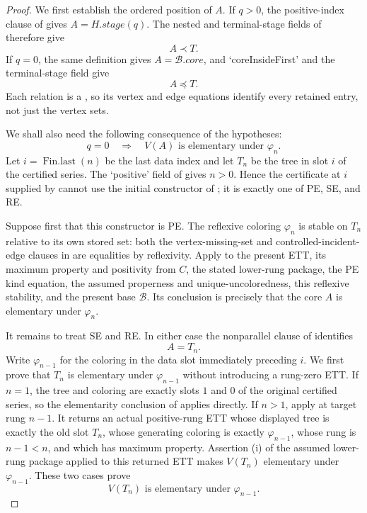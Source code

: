 \begin{proof}
We first establish the ordered position of $A$.  If $q>0$, the
positive-index clause of  gives
$A=H.\mathit{stage}(q)$.  The nested and terminal-stage fields of
 therefore give
\[
                     A\prec T.                                 \tag{1}
\]
If $q=0$, the same definition gives $A=\mathcal B.\mathit{core}$,
and `coreInsideFirst' and the terminal-stage field give
\[
                     A\preccurlyeq T.                           \tag{2}
\]
Each relation is a , so its vertex
and edge equations identify every retained entry, not just the vertex
sets.

We shall also need the following consequence of the hypotheses:
\[
 q=0\quad\Longrightarrow\quad
 V(A)\text{ is elementary under }\varphi_n.                    \tag{3}
\]
Let $i=\operatorname{Fin.last}(n)$ be the last data index and let
$T_n$ be the tree in slot $i$ of the certified series.  The `positive'
field of  gives $n>0$.  Hence the
certificate at $i$ supplied by  cannot use the
initial constructor of ; it is exactly one
of PE, SE, and RE.

Suppose first that this constructor is PE.  The reflexive coloring
$\varphi_n$ is stable on $T_n$ relative to its own stored set: both the
vertex-missing-set and controlled-incident-edge clauses in
 are equalities by reflexivity.  Apply
 to the present ETT, its maximum
property and positivity from $C$, the stated lower-rung package, the PE
kind equation, the assumed properness and unique-uncoloredness, this
reflexive stability, and the present base $\mathcal B$.  Its conclusion
is precisely that the core $A$ is elementary under $\varphi_n$.

It remains to treat SE and RE.  In either case the nonparallel clause of
 identifies
\[
                              A=T_n.                            \tag{4}
\]
Write $\varphi_{n-1}$ for the coloring in the data slot immediately
preceding $i$.  We first prove that $T_n$ is elementary under
$\varphi_{n-1}$ without introducing a rung-zero ETT.  If $n=1$, the
tree and coloring are exactly slots $1$ and $0$ of the original
certified series, so the elementarity conclusion of
 applies directly.  If $n>1$, apply
 at target rung $n-1$.  It returns an
actual positive-rung ETT whose displayed tree is exactly the old slot
$T_n$, whose generating coloring is exactly $\varphi_{n-1}$, whose rung
is $n-1<n$, and which has maximum property.  Assertion (i) of the
assumed lower-rung package applied to this returned ETT makes $V(T_n)$
elementary under $\varphi_{n-1}$.  These two cases prove
\[
 V(T_n)\text{ is elementary under }\varphi_{n-1}.              \tag{5}
\]


\end{proof}
